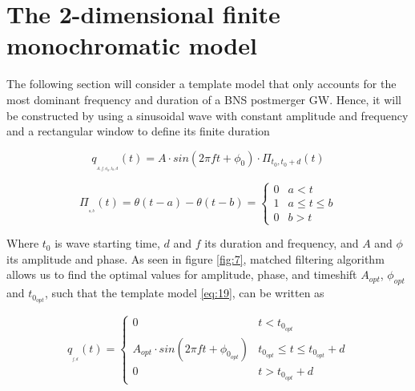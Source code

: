 \FloatBarrier


\section{The 2-dimensional finite monochromatic model}\label{2dsearch}

The following section will consider a template model that only accounts for the most dominant frequency and duration of a BNS postmerger GW. Hence, it will be constructed by using a sinusoidal wave with constant amplitude and frequency and a rectangular window to define its finite duration 


\begin{equation}\label{eq:19}
q_{_{_{A, f, \phi_0, t_{0}, d}}}(t) =A \cdot sin(2\pi f t + \phi_0) \cdot \Pi_{t_{0},t_{0} + d}(t)
\end{equation}


\begin{equation}\label{eq:18}
\Pi_{_{_{a,b}}}(t) = \theta(t-a)-\theta(t-b) = 
\begin{cases} 
      0 & a<t \\
      1 & a \leq t\leq b \\
      0 & b>t
   \end{cases}
\end{equation}

Where $t_0$ is wave starting time, $d$ and $f$ its duration and frequency, and $A$ and $\phi$ its amplitude and phase. As seen in figure \ref{fig:7}, matched filtering algorithm allows us to find the optimal values for amplitude, phase, and timeshift $A_{opt}$, $\phi_{opt}$ and $t_{0_{opt}}$, such that the template model \ref{eq:19}, can be written as

\begin{equation}\label{eq:20}
q_{_{_{f,d}}}(t) =
\begin{cases} 
      0 & t<t_{0_{opt}} \\
      A_{opt} \cdot sin(2\pi f t + \phi_{0_{opt}}) & t_{0_{opt}} \leq t\leq t_{0_{opt}}+d \\
      0 & t>t_{0_{opt}}+d
   \end{cases}
\end{equation}

